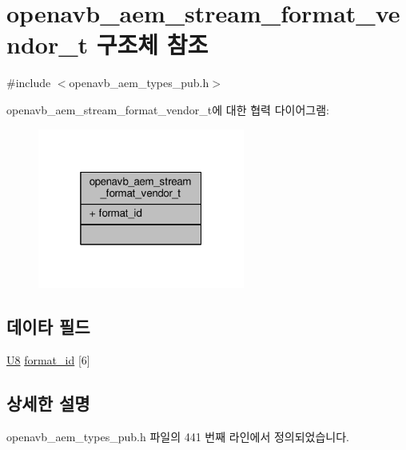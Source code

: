 \hypertarget{structopenavb__aem__stream__format__vendor__t}{}\section{openavb\+\_\+aem\+\_\+stream\+\_\+format\+\_\+vendor\+\_\+t 구조체 참조}
\label{structopenavb__aem__stream__format__vendor__t}


{\ttfamily \#include $<$openavb\+\_\+aem\+\_\+types\+\_\+pub.\+h$>$}



openavb\+\_\+aem\+\_\+stream\+\_\+format\+\_\+vendor\+\_\+t에 대한 협력 다이어그램\+:
\nopagebreak
\begin{figure}[H]
\begin{center}
\leavevmode
\includegraphics[width=193pt]{structopenavb__aem__stream__format__vendor__t__coll__graph}
\end{center}
\end{figure}
\subsection*{데이타 필드}
\begin{DoxyCompactItemize}
\item 
\hyperlink{openavb__types__base__pub_8h_aa63ef7b996d5487ce35a5a66601f3e73}{U8} \hyperlink{structopenavb__aem__stream__format__vendor__t_ae1ff7c8bfecfa86c9ab47966bf21d53e}{format\+\_\+id} \mbox{[}6\mbox{]}
\end{DoxyCompactItemize}


\subsection{상세한 설명}


openavb\+\_\+aem\+\_\+types\+\_\+pub.\+h 파일의 441 번째 라인에서 정의되었습니다.



